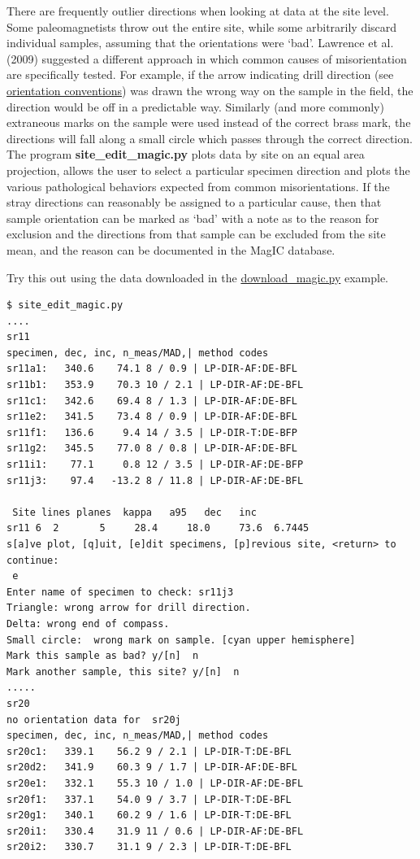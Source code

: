 \documentclass[11pt]{book}
\begin{document}
{There are frequently outlier directions when looking at data at the site level.  Some paleomagnetists throw out the entire site, while some arbitrarily discard individual samples, assuming that the orientations were `bad'.  Lawrence et al. (2009) \nocite{lawrence09} suggested a different approach in which common causes of misorientation are specifically tested.  For example, if the arrow indicating drill direction (see \href{#orientiation\_magic.py}{orientation conventions}) was drawn the wrong way on the sample in the field, the direction would be off in a predictable way.  Similarly (and more commonly) extraneous marks on the sample were used instead of the correct brass mark, the directions will fall along a small circle which passes through the correct direction.  The program {\bf site\_edit\_magic.py} plots data by site on an equal area projection, allows the user to select a particular specimen direction and plots the various pathological behaviors expected from common misorientations.  If the stray directions can reasonably be assigned to a particular cause, then that sample orientation can be marked as `bad' with a note as to the reason for exclusion and the directions from that sample can be excluded from the site mean, and the reason can be documented in the MagIC database.

Try this out using the data downloaded  in the \href{#download_magic.py}{download\_magic.py} example.

\begin{verbatim}
$ site_edit_magic.py
....
sr11
specimen, dec, inc, n_meas/MAD,| method codes
sr11a1:   340.6    74.1 8 / 0.9 | LP-DIR-AF:DE-BFL
sr11b1:   353.9    70.3 10 / 2.1 | LP-DIR-AF:DE-BFL
sr11c1:   342.6    69.4 8 / 1.3 | LP-DIR-AF:DE-BFL
sr11e2:   341.5    73.4 8 / 0.9 | LP-DIR-AF:DE-BFL
sr11f1:   136.6     9.4 14 / 3.5 | LP-DIR-T:DE-BFP
sr11g2:   345.5    77.0 8 / 0.8 | LP-DIR-AF:DE-BFL
sr11i1:    77.1     0.8 12 / 3.5 | LP-DIR-AF:DE-BFP
sr11j3:    97.4   -13.2 8 / 11.8 | LP-DIR-AF:DE-BFL

 Site lines planes  kappa   a95   dec   inc
sr11 6  2       5     28.4     18.0     73.6  6.7445
s[a]ve plot, [q]uit, [e]dit specimens, [p]revious site, <return> to continue:
 e
Enter name of specimen to check: sr11j3
Triangle: wrong arrow for drill direction.
Delta: wrong end of compass.
Small circle:  wrong mark on sample. [cyan upper hemisphere]
Mark this sample as bad? y/[n]  n
Mark another sample, this site? y/[n]  n
.....
sr20
no orientation data for  sr20j
specimen, dec, inc, n_meas/MAD,| method codes
sr20c1:   339.1    56.2 9 / 2.1 | LP-DIR-T:DE-BFL
sr20d2:   341.9    60.3 9 / 1.7 | LP-DIR-AF:DE-BFL
sr20e1:   332.1    55.3 10 / 1.0 | LP-DIR-AF:DE-BFL
sr20f1:   337.1    54.0 9 / 3.7 | LP-DIR-T:DE-BFL
sr20g1:   340.1    60.2 9 / 1.6 | LP-DIR-T:DE-BFL
sr20i1:   330.4    31.9 11 / 0.6 | LP-DIR-AF:DE-BFL
sr20i2:   330.7    31.1 9 / 2.3 | LP-DIR-T:DE-BFL


\end{verbatim}}
\end{document}
